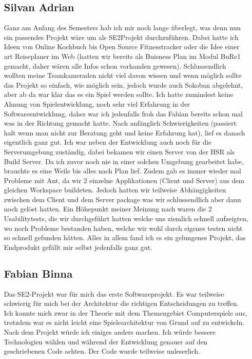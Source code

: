 \documentclass[11pt]{scrartcl}
\begin{document}
\subsection{Silvan Adrian}
Ganz am Anfang des Semesters hab ich mir noch lange überlegt, was denn nun ein
passendes Projekt wäre um als SE2Projekt durchzuführen.
Dabei hatte ich Ideen von Online Kochbuch bis Open Source Fitnesstracker 
 oder die Idee einer art Reiseplaner im Web (hatten wir 
bereits als Buisness Plan im Modul BuRe1 gemacht, daher wären 
alle Infos schon vorhanden gewesen).
Schlussendlich wollten meine Teamkameraden nicht viel davon wissen und
wenn möglich sollte das Projekt so einfach, wie möglich sein, jedoch wurde auch 
Sokoban abgelehnt, aber ab da war klar das es ein Spiel werden sollte.
Ich hatte zumindest keine Ahnung von Spielentwicklung, noch sehr viel Erfahrung in 
der Softwareentwicklung, daher war ich jedenfalls froh das Fabian bereits schon mal was in
der Richtung gemacht hatte.
Nach anfänglich Schwierigkeiten (passiert halt wenn man nicht zur 
Beratung geht und keine Erfahrung hat), lief es danach eigentlich ganz gut.
Ich war neben der Entwicklung auch noch für die Serverumgebung zuständig, dabei
bekamen wir einen Server von der HSR als Build Server.
Da ich zuvor noch nie in einer solchen Umgebung gearbeitet habe, brauchte es 
eine Weile bis alles nach Plan lief.
Zudem gab es immer wieder mal Probleme mit Ant, da wir 2 einzelne Applikationen
(Client und Server) aus dem gleichen Workspace buildeten. 
Jedoch hatten wir teilweise Abhängigkeiten zwischen dem Client und dem Server 
package was wir schlussendlich aber dann noch gelöst hatten.
Ein Höhepunkt meiner Meinung nach waren die 2 Usabilitytests, die 
wir durchgeführt hatten welche uns ziemlich schnell aufzeigten, wo noch Probleme
bestanden haben, welche wir wohl durch eigenes testen nicht so schnell gefunden 
hätten.
Alles in allem fand ich es ein gelungenes Projekt, das Endprodukt gefällt mir 
selbst jedenfalls ganz gut.
\newpage
\subsection{Fabian Binna}
Das SE2-Projekt war für mich das erste Softwareprojekt. Es war teilweise schwierig für mich bei der Architektur die richtigen Entscheidungen zu treffen. Ich kannte mich zwar in der Theorie mit dem Themengebiet Computerspiele aus, trotzdem war es nicht leicht eine Spielearchitektur von Grund auf zu entwickeln. Nach dem Projekt würde ich einiges anders machen. Ich würde bessere Technologien wählen und während der Entwicklung genauer auf den geschriebenen Code achten. Der Code wurde teilweise unleserlich.
\end{document}
